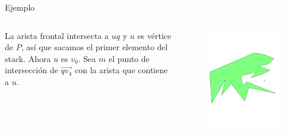 \documentclass[aspectratio=169,xcolor=dvipsnames, t]{beamer}
\begin{document}
\begin{frame}{Ejemplo}
  \begin{columns}
    \begin{column}{0.3\textwidth}
      \raggedright %
      La arista frontal intersecta a $uq$ y $u$ es vértice de $P$, así que sacamos el primer elemento del stack. Ahora $u$ es $v_{0}$. Sea $m$ el punto de intersección de $\overrightarrow{qv_{4}}$ con la arista que contiene a $u$.
    \end{column}
    \begin{column}{0.7\textwidth}
      \vspace{-2.5cm} %
      \begin{figure}
        \centering
        \includegraphics[width=1\linewidth, height=.95\textheight, page=15, keepaspectratio]{IPE/point_visibility.pdf}
      \end{figure}
    \end{column}
  \end{columns}
\end{frame}
\end{document}
